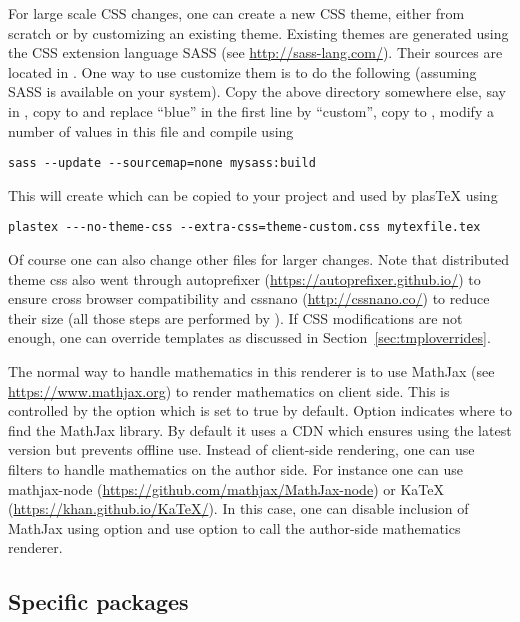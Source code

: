 For large scale CSS changes, one can create a new
CSS theme, either from scratch or by customizing an existing theme.
Existing themes are generated using the CSS extension language SASS (see
\url{http://sass-lang.com/}). Their sources are located in
. One way to use customize
them is to do the following (assuming SASS is available on your system).
Copy the above directory somewhere else, say in , copy
 to  and replace ``blue''
in the first line by ``custom'', copy  to
, modify a number of values in this file
and compile using
\begin{verbatim}
sass --update --sourcemap=none mysass:build
\end{verbatim}
This will create  which can be copied to
your project and used by plasTeX using
\begin{verbatim}
plastex ---no-theme-css --extra-css=theme-custom.css mytexfile.tex
\end{verbatim}
Of course one can also change other  files for larger
changes. Note that distributed theme css also went through autoprefixer
(\url{https://autoprefixer.github.io/}) to ensure cross browser
compatibility and cssnano (\url{http://cssnano.co/}) to reduce their
size (all those steps are performed by
). If CSS
modifications are not enough, one can override templates as discussed in
Section~\ref{sec:tmploverrides}.

The normal way to handle mathematics in this renderer is to use MathJax
(see \url{https://www.mathjax.org}) to render mathematics on client side.
This is controlled by the  option which is
set to true by default. Option  indicates
where to find the MathJax library. By default it uses a CDN which
ensures using the latest version but prevents offline use.
Instead of client-side rendering, one can use filters to handle
mathematics on the author side. For instance one can use mathjax-node
(\url{https://github.com/mathjax/MathJax-node}) or KaTeX
(\url{https://khan.github.io/KaTeX/}). In this case, one can disable
inclusion of MathJax using option  and
use option  to call the author-side
mathematics renderer.

\subsection{Specific packages}

